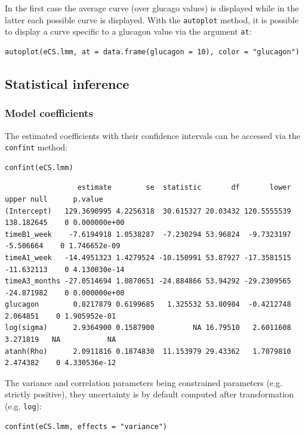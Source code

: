 \documentclass[12pt]{article}
\begin{document}
In the first case the average curve (over glucago values) is displayed
while in the latter each possible curve is displayed. With the
\texttt{autoplot} method, it is possible to display a curve specific to a
glucagon value via the argument \texttt{at}:
\lstset{language=r,label= ,caption= ,captionpos=b,numbers=none}
\begin{lstlisting}
autoplot(eCS.lmm, at = data.frame(glucagon = 10), color = "glucagon")
\end{lstlisting}

\subsection{Statistical inference}
\label{sec:org90f6b13}

\subsubsection{Model coefficients}
\label{sec:org901443e}

The estimated coefficients with their confidence intervals can be accessed via the \texttt{confint} method:
\lstset{language=r,label= ,caption= ,captionpos=b,numbers=none}
\begin{lstlisting}
confint(eCS.lmm)
\end{lstlisting}

\begin{verbatim}
                 estimate        se  statistic       df       lower      upper null      p.value
(Intercept)   129.3690995 4.2256318  30.615327 20.03432 120.5555539 138.182645    0 0.000000e+00
timeB1_week    -7.6194918 1.0538287  -7.230294 53.96824  -9.7323197  -5.506664    0 1.746652e-09
timeA1_week   -14.4951323 1.4279524 -10.150991 53.87927 -17.3581515 -11.632113    0 4.130030e-14
timeA3_months -27.0514694 1.0870651 -24.884866 53.94292 -29.2309565 -24.871982    0 0.000000e+00
glucagon        0.8217879 0.6199685   1.325532 53.80984  -0.4212748   2.064851    0 1.905952e-01
log(sigma)      2.9364900 0.1587900         NA 16.79510   2.6011608   3.271819   NA           NA
atanh(Rho)      2.0911816 0.1874830  11.153979 29.43362   1.7079810   2.474382    0 4.330536e-12
\end{verbatim}


The variance and correlation parameters being constrained parameters
(e.g. strictly positive), they uncertainty is by default computed
after transformation (e.g. \texttt{log}):
\lstset{language=r,label= ,caption= ,captionpos=b,numbers=none}
\begin{lstlisting}
confint(eCS.lmm, effects = "variance")
\end{lstlisting}
\end{document}
